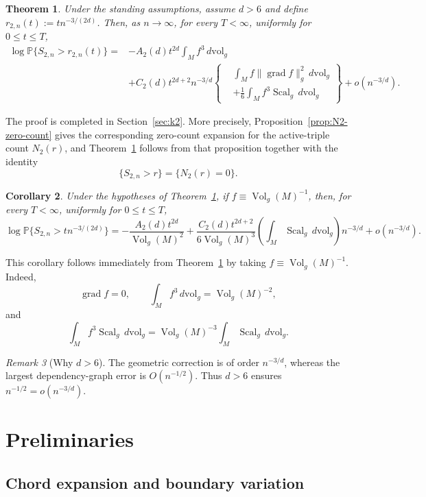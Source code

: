 \documentclass[11pt]{article}
\newtheorem{theorem}{Theorem}[section]
\newtheorem{corollary}[theorem]{Corollary}
\theoremstyle{remark}
\newtheorem{remark}[theorem]{Remark}
\newcommand{\Vol}{\operatorname{Vol}}
\newcommand{\Scal}{\operatorname{Scal}}
\newcommand{\grad}{\operatorname{grad}}
\newcommand{\Pp}{\mathbb P}
\numberwithin{equation}{section}
\begin{document}
\begin{theorem}
\label{thm:S2}
Under the standing assumptions, assume $d>6$ and define
$r_{2,n}(t):=t n^{-3/(2d)}$.
Then, as $n\to\infty$, for every $T<\infty$, uniformly for
$0\le t\le T$,
\[
\begin{aligned}
\log\Pp\{S_{2,n}>r_{2,n}(t)\}
={}&-A_2(d)t^{2d}\int_M f^3\,d\mathrm{vol}_g\\
&+C_2(d)t^{2d+2}n^{-3/d}
\left\{
\begin{aligned}
&\int_M f\|\grad f\|_g^2\,d\mathrm{vol}_g\\
&+\frac16\int_M f^3\Scal_g\,d\mathrm{vol}_g
\end{aligned}
\right\}
+o(n^{-3/d}).
\end{aligned}
\]
\end{theorem}

The proof is completed in Section~\ref{sec:k2}.
More precisely, Proposition~\ref{prop:N2-zero-count} gives the
corresponding zero-count expansion for the active-triple count
$N_2(r)$, and Theorem~\ref{thm:S2} follows from that proposition together
with the identity
\[
\{S_{2,n}>r\}=\{N_2(r)=0\}.
\]

\begin{corollary}
Under the hypotheses of Theorem~\ref{thm:S2}, if
$f\equiv \Vol_g(M)^{-1}$, then, for every $T<\infty$, uniformly for
$0\le t\le T$,
\[
\log\Pp\{S_{2,n}>t n^{-3/(2d)}\}
=-\frac{A_2(d)t^{2d}}{\Vol_g(M)^2}
+\frac{C_2(d)t^{2d+2}}{6\Vol_g(M)^3}
\left(
\int_M\Scal_g\,d\mathrm{vol}_g
\right)n^{-3/d}
+o(n^{-3/d}).
\]
\end{corollary}

This corollary follows immediately from Theorem~\ref{thm:S2} by taking
$f\equiv\Vol_g(M)^{-1}$.  Indeed,
\[
\grad f=0,
\qquad
\int_M f^3\,d\mathrm{vol}_g
=\Vol_g(M)^{-2},
\]
and
\[
\int_M f^3\Scal_g\,d\mathrm{vol}_g
=
\Vol_g(M)^{-3}
\int_M\Scal_g\,d\mathrm{vol}_g.
\]

\begin{remark}[Why $d>6$]
The geometric correction is of order $n^{-3/d}$, whereas the
largest dependency-graph error is $O(n^{-1/2})$.  Thus $d>6$ ensures
$n^{-1/2}=o(n^{-3/d})$.
\end{remark}

\section{Preliminaries}
\label{sec:preliminaries}


\subsection{Chord expansion and boundary variation}
\end{document}

